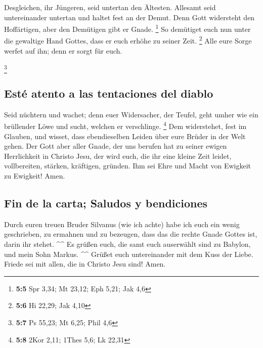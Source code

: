  Desgleichen, ihr Jüngeren, seid untertan den Ältesten.
Allesamt seid untereinander untertan und haltet fest an der Demut. Denn
Gott widersteht den Hoffärtigen, aber den Demütigen gibt er Gnade.
\footnote{\textbf{5:5} Spr 3,34; Mt 23,12; Eph 5,21; Jak 4,6}
 So demütiget euch nun unter die gewaltige Hand Gottes,
dass er euch erhöhe zu seiner Zeit. \footnote{\textbf{5:6} Hi 22,29; Jak
  4,10}  Alle eure Sorge werfet auf ihn; denn er sorgt für
euch.

\footnote{\textbf{5:7} Ps 55,23; Mt 6,25; Phil 4,6}

\hypertarget{estuxe9-atento-a-las-tentaciones-del-diablo}{%
\subsection{Esté atento a las tentaciones del
diablo}\label{estuxe9-atento-a-las-tentaciones-del-diablo}}

 Seid nüchtern und wachet; denn euer Widersacher, der
Teufel, geht umher wie ein brüllender Löwe und sucht, welchen er
verschlinge. \footnote{\textbf{5:8} 2Kor 2,11; 1Thes 5,6; Lk 22,31}
 Dem widerstehet, fest im Glauben, und wisset, dass
ebendieselben Leiden über eure Brüder in der Welt gehen. 
Der Gott aber aller Gnade, der uns berufen hat zu seiner ewigen
Herrlichkeit in Christo Jesu, der wird euch, die ihr eine kleine Zeit
leidet, vollbereiten, stärken, kräftigen, gründen.  Ihm
sei Ehre und Macht von Ewigkeit zu Ewigkeit! Amen.

\hypertarget{fin-de-la-carta-saludos-y-bendiciones}{%
\subsection{Fin de la carta; Saludos y
bendiciones}\label{fin-de-la-carta-saludos-y-bendiciones}}

 Durch euren treuen Bruder Silvanus (wie ich achte) habe
ich euch ein wenig geschrieben, zu ermahnen und zu bezeugen, dass das
die rechte Gnade Gottes ist, darin ihr stehet. \^{}\^{} 
Es grüßen euch, die samt euch auserwählt sind zu Babylon, und mein Sohn
Markus. \^{}\^{}  Grüßet euch untereinander mit dem Kuss
der Liebe. Friede sei mit allen, die in Christo Jesu sind! Amen.
